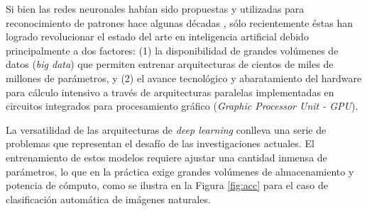 \documentclass[spanish]{article}
\theoremstyle{definition}
\theoremstyle{remark}
\numberwithin{equation}{section}
\numberwithin{equation}{section} %
\begin{document}
Si bien las redes neuronales habían sido propuestas y utilizadas para reconocimiento de patrones hace algunas décadas \cite{fukushima1980neocognitron,lecun1989backpropagation,bishop1995neural}, sólo recientemente éstas han logrado revolucionar el estado del arte en inteligencia artificial debido principalmente a dos factores: (1) la disponibilidad de grandes volúmenes de datos (\textit{big data}) que permiten entrenar arquitecturas de cientos de miles de millones de parámetros, y (2) el avance tecnológico y abaratamiento del hardware para cálculo intensivo a través de arquitecturas paralelas implementadas en circuitos integrados para procesamiento gráfico (\textit{Graphic Processor Unit - GPU}).\par

La versatilidad de las arquitecturas de {\it deep learning} conlleva una serie de problemas que representan el desafío de las investigaciones actuales. El entrenamiento de estos modelos requiere ajustar una cantidad inmensa de parámetros, lo que en la práctica exige grandes volúmenes de almacenamiento y potencia de cómputo, como se ilustra en la Figura \ref{fig:acc} para el caso de clasificación automática de imágenes naturales. \par
\end{document}
